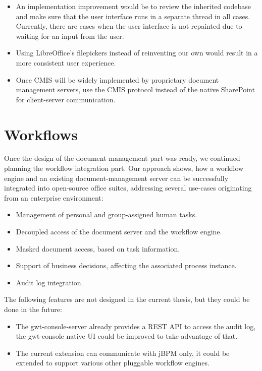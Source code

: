 \begin{itemize}
\item An implementation improvement would be to review the inherited codebase
and make sure that the user interface runs in a separate thread in all cases.
Currently, there are cases when the user interface is not repainted due to
waiting for an input from the user.
\item Using LibreOffice's filepickers instead of reinventing our own would
result in a more consistent user experience.
\item Once CMIS will be widely implemented by proprietary document management
servers, use the CMIS protocol instead of the native SharePoint for
client-server communication.
\end{itemize}

\section{Workflows}

Once the design of the document management part was ready, we continued
planning the workflow integration part. Our approach shows, how a workflow
engine and an existing document-management server can be successfully
integrated into open-source office suites, addressing several use-cases
originating from an enterprise environment:

\begin{itemize}
\item Management of personal and group-assigned human tasks.
\item Decoupled access of the document server and the workflow engine.
\item Masked document access, based on task information.
\item Support of business decisions, affecting the associated process instance.
\item Audit log integration.
\end{itemize}

The following features are not designed in the current thesis, but they could
be done in the future:

\begin{itemize}
\item The gwt-console-server already provides a REST API to access the audit log,
the gwt-console native UI could be improved to take advantage of that.
\item The current extension can communicate with jBPM only, it could be
extended to support various other pluggable workflow engines.
\end{itemize}

